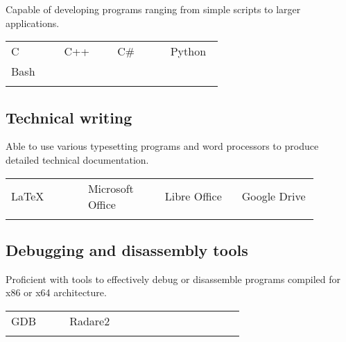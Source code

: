 \documentclass[letterpaper]{article}
\begin{document}
        Capable of developing programs ranging from simple scripts to larger applications.

        \begin{center}
        \begin{tabular}{p{0.22\linewidth} p{0.22\linewidth} p{0.22\linewidth} p{0.22\linewidth}}
            \\
            C & C++ & C\# & Python \\
            Bash &&&\\
            \\
        \end{tabular}
        \end{center}

        \subsection*{Technical writing}

        Able to use various typesetting programs and word processors to produce detailed technical documentation.

        \begin{center}
        \begin{tabular}{p{0.22\linewidth} p{0.22\linewidth} p{0.22\linewidth} p{0.22\linewidth}}
            \\
            LaTeX & Microsoft Office & Libre Office & Google Drive \\
            \\
        \end{tabular}
        \end{center}

        \subsection*{Debugging and disassembly tools}
        Proficient with tools to effectively debug or disassemble programs compiled for x86 or x64 architecture.

        \begin{center}
        \begin{tabular}{p{0.22\linewidth} p{0.22\linewidth} p{0.22\linewidth} p{0.22\linewidth}}
            \\
            GDB & Radare2 &&\\
            \\
        \end{tabular}
        \end{center}
\end{document}
